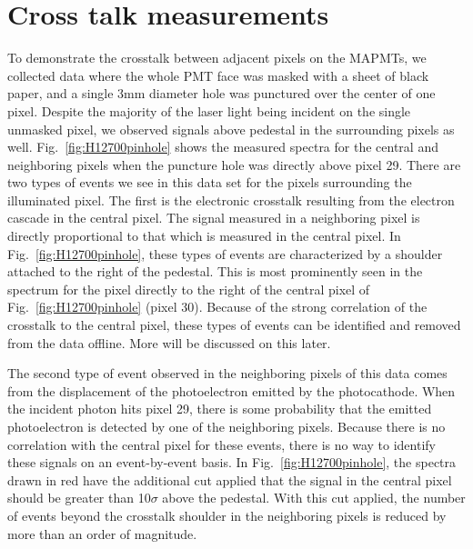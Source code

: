 \section{Cross talk measurements}

To demonstrate the crosstalk between adjacent pixels on the MAPMTs, we collected data where the whole PMT face was masked with a sheet of black paper, and a single 3mm diameter hole was punctured over the center of one pixel. Despite the majority of the laser light being incident on the single unmasked pixel, we observed signals above pedestal in the surrounding pixels as well. Fig.~\ref{fig:H12700pinhole} shows the measured spectra for the central and neighboring pixels when the puncture hole was directly above pixel 29. There are two types of events we see in this data set for the pixels surrounding the illuminated pixel. The first is the electronic crosstalk resulting from the electron cascade in the central pixel. The signal measured in a neighboring pixel is directly proportional to that which is measured in the central pixel. In Fig.~\ref{fig:H12700pinhole}, these types of events are characterized by a shoulder attached to the right of the pedestal. This is most prominently seen in the spectrum for the pixel directly to the right of the central pixel of Fig.~\ref{fig:H12700pinhole} (pixel 30). Because of the strong correlation of the crosstalk to the central pixel, these types of events can be identified and removed from the data offline. More will be discussed on this later.

The second type of event observed in the neighboring pixels of this data comes from the displacement of the photoelectron emitted by the photocathode. When the incident photon hits pixel 29, there is some probability that the emitted photoelectron is detected by one of the neighboring pixels. Because there is no correlation with the central pixel for these events, there is no way to identify these signals on an event-by-event basis. In Fig.~\ref{fig:H12700pinhole}, the spectra drawn in red have the additional cut applied that the signal in the central pixel should be greater than 10$\sigma$ above the pedestal. With this cut applied, the number of events beyond the crosstalk shoulder in the neighboring pixels is reduced by more than an order of magnitude.

